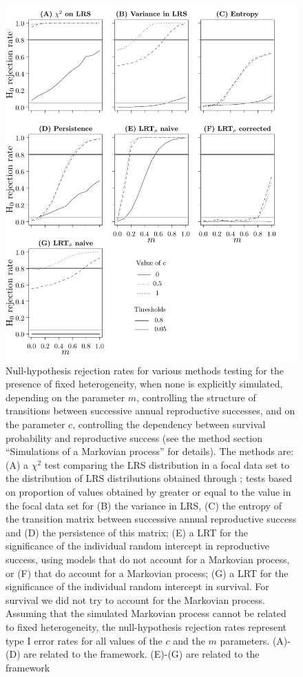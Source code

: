 \begin{figure}[H]
	\includegraphics[width=\textwidth]{FiguresDynHet/Figure3}
	\caption{ \footnotesize Null-hypothesis rejection rates for various methods testing for the presence of fixed heterogeneity, when none is explicitly simulated, depending on the parameter $m$, controlling the structure of transitions between successive annual reproductive successes, and on the parameter $c$, controlling the dependency between survival probability and reproductive success (see the method section ``Simulations of a Markovian process'' for details). The methods are: (A) a $\chi^2$ test comparing the LRS distribution in a focal data set to the distribution of LRS distributions obtained through \NSM; tests based on proportion of values obtained by \NSM greater or equal to the value in the focal data set for (B) the variance in LRS, (C) the entropy of the transition matrix between successive annual reproductive success and (D) the persistence of this matrix; (E) a LRT for the significance of the individual random intercept in reproductive success, using models that do not account for a Markovian process, or (F) that do account for a Markovian process; (G) a LRT for the significance of the individual random intercept in survival. For survival we did not try to account for the Markovian process. Assuming that the simulated Markovian process cannot be related to fixed heterogeneity, the null-hypothesis rejection rates represent type I error rates for all values of the $c$ and the $m$ parameters. (A)-(D) are related to the \NSM framework. (E)-(G) are related to the \MM framework}
	\label{figure:Markov}
\end{figure}

